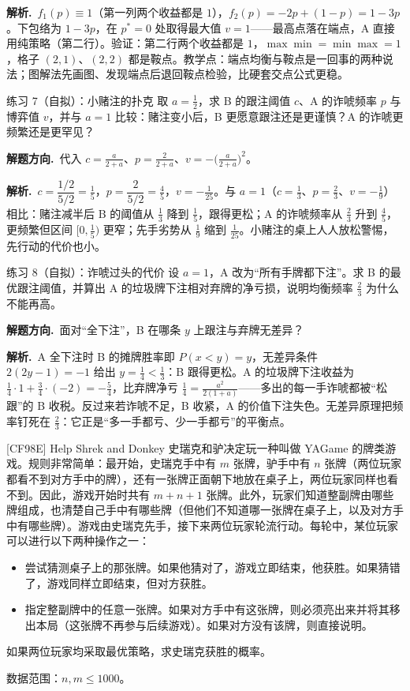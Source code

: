 \documentclass[UTF8,a4paper,11pt,oneside,openany,fontset=fandol]{ctexbook}
\theoremstyle{definition}
\newcommand{\sol}{\par\noindent\textbf{解析.}\ }
\newcommand{\hint}{\par\noindent\textbf{解题方向.}\ }
\begin{document}
\sol $f_1(p)\equiv1$（第一列两个收益都是 $1$），$f_2(p)=-2p+(1-p)=1-3p$。下包络为 $1-3p$，在 $p^{*}=0$ 处取得最大值 $v=1$——最高点落在端点，A 直接用纯策略（第二行）。验证：第二行两个收益都是 $1$，$\max\min=\min\max=1$，格子 $(2,1)$、$(2,2)$ 都是鞍点。教学点：端点均衡与鞍点是一回事的两种说法；图解法先画图、发现端点后退回鞍点检验，比硬套交点公式更稳。

\begin{problem}{练习 7（自拟）：小赌注的扑克}
取 $a=\tfrac12$，求 B 的跟注阈值 $c$、A 的诈唬频率 $p$ 与博弈值 $v$，并与 $a=1$ 比较：赌注变小后，B 更愿意跟注还是更谨慎？A 的诈唬更频繁还是更罕见？
\end{problem}

\hint 代入 $c=\tfrac{a}{2+a}$、$p=\tfrac{2}{2+a}$、$v=-\bigl(\tfrac{a}{2+a}\bigr)^{2}$。

\sol $c=\dfrac{1/2}{5/2}=\tfrac15$，$p=\dfrac{2}{5/2}=\tfrac45$，$v=-\tfrac1{25}$。与 $a=1$（$c=\tfrac13$、$p=\tfrac23$、$v=-\tfrac19$）相比：赌注减半后 B 的阈值从 $\tfrac13$ 降到 $\tfrac15$，跟得更松；A 的诈唬频率从 $\tfrac23$ 升到 $\tfrac45$，更频繁但区间 $[0,\tfrac15)$ 更窄；先手劣势从 $\tfrac19$ 缩到 $\tfrac1{25}$。小赌注的桌上人人放松警惕，先行动的代价也小。

\begin{problem}{练习 8（自拟）：诈唬过头的代价}
设 $a=1$，A 改为“所有手牌都下注”。求 B 的最优跟注阈值，并算出 A 的垃圾牌下注相对弃牌的净亏损，说明均衡频率 $\tfrac23$ 为什么不能再高。
\end{problem}

\hint 面对“全下注”，B 在哪条 $y$ 上跟注与弃牌无差异？

\sol A 全下注时 B 的摊牌胜率即 $P(x<y)=y$，无差异条件 $2(2y-1)=-1$ 给出 $y=\tfrac14<\tfrac13$：B 跟得更松。A 的垃圾牌下注收益为 $\tfrac14\cdot 1+\tfrac34\cdot(-2)=-\tfrac54$，比弃牌净亏 $\tfrac14=\tfrac{a^{2}}{2(1+a)}$——多出的每一手诈唬都被“松跟”的 B 收税。反过来若诈唬不足，B 收紧，A 的价值下注失色。无差异原理把频率钉死在 $\tfrac23$：它正是“多一手都亏、少一手都亏”的平衡点。
\begin{problem}{[CF98E] Help Shrek and Donkey}
史瑞克和驴决定玩一种叫做 YAGame 的牌类游戏。规则非常简单：最开始，史瑞克手中有 $m$ 张牌，驴手中有 $n$ 张牌（两位玩家都看不到对方手中的牌），还有一张牌正面朝下地放在桌子上，两位玩家同样也看不到。因此，游戏开始时共有 $m+n+1$ 张牌。此外，玩家们知道整副牌由哪些牌组成，也清楚自己手中有哪些牌（但他们不知道哪一张牌在桌子上，以及对方手中有哪些牌）。游戏由史瑞克先手，接下来两位玩家轮流行动。每轮中，某位玩家可以进行以下两种操作之一：
\begin{itemize}
\item 尝试猜测桌子上的那张牌。如果他猜对了，游戏立即结束，他获胜。如果猜错了，游戏同样立即结束，但对方获胜。
\item 指定整副牌中的任意一张牌。如果对方手中有这张牌，则必须亮出来并将其移出本局（这张牌不再参与后续游戏）。如果对方没有该牌，则直接说明。
\end{itemize}
如果两位玩家均采取最优策略，求史瑞克获胜的概率。

数据范围：$n,m\le1000$。
\end{problem}
\end{document}

